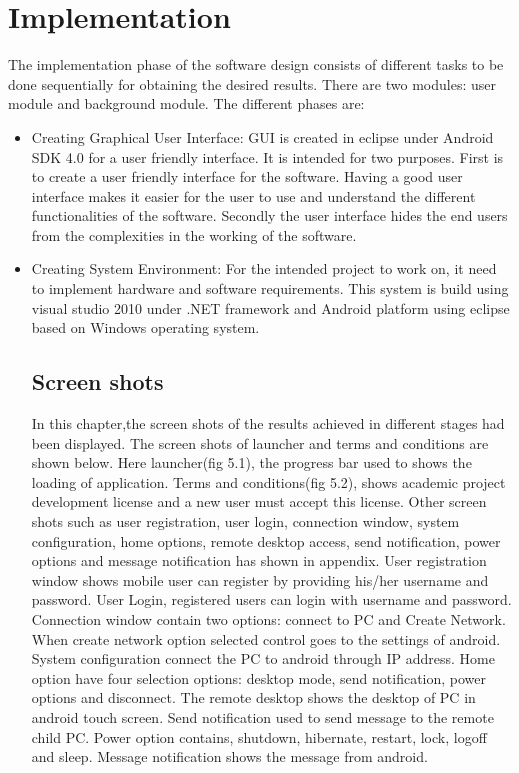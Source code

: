 \chapter{Implementation}
\label{Implementation}
	The implementation phase of the software design consists of different tasks to be done sequentially for obtaining the desired results. There are two modules: user module and background module. The different phases are:
\begin{itemize}
\item Creating Graphical User Interface: GUI is created in eclipse under Android SDK 4.0 for a user friendly interface. It is intended for two purposes. First is to create a user friendly interface for the software. Having a good user interface makes it easier for the user to use and understand the different functionalities of the software. Secondly the user interface hides the end users from the complexities in the working of the software.

\item Creating System Environment: For the intended project to work on, it need to implement hardware and software requirements. This system is build using visual studio 2010 under .NET framework and Android platform using eclipse based on Windows operating system.

\section{Screen shots}
\label{Screen shots}
In this chapter,the screen shots of the results achieved in different stages had been displayed. The screen shots of launcher and terms and conditions are shown below. Here launcher(fig 5.1), the progress bar used to shows the loading of application. Terms and conditions(fig 5.2), shows academic project development license and a new user must accept this license.
\newline 	Other screen shots such as user registration, user login, connection window, system configuration, home options, remote desktop access, send notification, power options and message notification has shown in appendix.
\newline User registration window shows mobile user can register by providing his/her username and password. User Login, registered users can login with username and password. Connection window contain two options: connect to PC and Create Network. When create network option selected control goes to the settings of android. System configuration connect the PC to android through IP address. Home option have four selection options: desktop mode, send notification, power options and disconnect. The remote desktop shows the desktop of PC in android touch screen. Send notification used to send message to the remote child PC. Power option contains, shutdown, hibernate, restart, lock, logoff and sleep. Message notification shows the message from android.  
	

\end{itemize}
